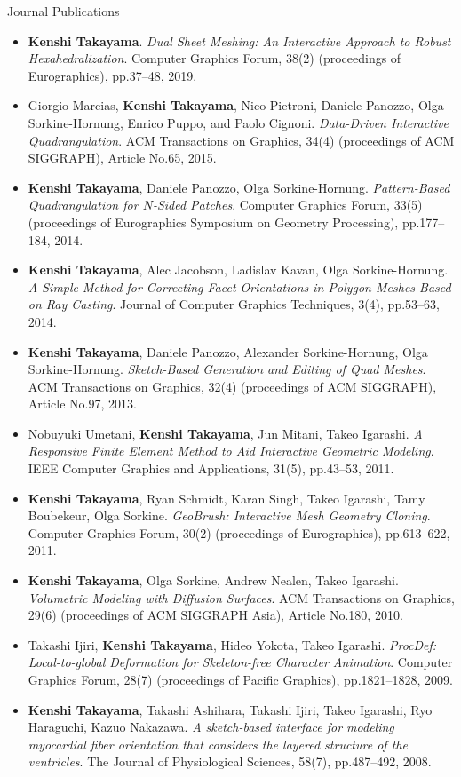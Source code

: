 {\Large\sc Journal Publications}
\vspace{-3mm}
\begin{itemize}
\item {\bf Kenshi Takayama}. {\it Dual Sheet Meshing: An Interactive Approach to Robust Hexahedralization}. Computer Graphics Forum, 38(2) (proceedings of Eurographics), pp.37--48, 2019.
\item Giorgio Marcias, {\bf Kenshi Takayama}, Nico Pietroni, Daniele Panozzo, Olga Sorkine-Hornung, Enrico Puppo, and Paolo Cignoni. {\it Data-Driven Interactive Quadrangulation}. ACM Transactions on Graphics, 34(4) (proceedings of ACM SIGGRAPH), Article No.65, 2015.
\item {\bf Kenshi Takayama}, Daniele Panozzo, Olga Sorkine-Hornung. {\it Pattern-Based Quadrangulation for $N$-Sided Patches}. Computer Graphics Forum, 33(5) (proceedings of Eurographics Symposium on Geometry Processing), pp.177--184, 2014.
\item {\bf Kenshi Takayama}, Alec Jacobson, Ladislav Kavan, Olga Sorkine-Hornung. {\it A Simple Method for Correcting Facet Orientations in Polygon Meshes Based on Ray Casting}. Journal of Computer Graphics Techniques, 3(4), pp.53--63, 2014.
\item {\bf Kenshi Takayama}, Daniele Panozzo, Alexander Sorkine-Hornung, Olga Sorkine-Hornung. {\it Sketch-Based Generation and Editing of Quad Meshes}. ACM Transactions on Graphics, 32(4) (proceedings of ACM SIGGRAPH), Article No.97, 2013.
\item Nobuyuki Umetani, {\bf Kenshi Takayama}, Jun Mitani, Takeo Igarashi. {\it A Responsive Finite Element Method to Aid Interactive Geometric Modeling}. IEEE Computer Graphics and Applications, 31(5), pp.43--53, 2011.
\item {\bf Kenshi Takayama}, Ryan Schmidt, Karan Singh, Takeo Igarashi, Tamy Boubekeur, Olga Sorkine. {\it GeoBrush: Interactive Mesh Geometry Cloning}. Computer Graphics Forum, 30(2) (proceedings of Eurographics), pp.613--622, 2011.
\item {\bf Kenshi Takayama}, Olga Sorkine, Andrew Nealen, Takeo Igarashi. {\it Volumetric Modeling with Diffusion Surfaces}. ACM Transactions on Graphics, 29(6) (proceedings of ACM SIGGRAPH Asia), Article No.180, 2010.
\item Takashi Ijiri, {\bf Kenshi Takayama}, Hideo Yokota, Takeo Igarashi. {\it ProcDef: Local-to-global Deformation for Skeleton-free Character Animation}. Computer Graphics Forum, 28(7) (proceedings of Pacific Graphics), pp.1821--1828, 2009.
\item {\bf Kenshi Takayama}, Takashi Ashihara, Takashi Ijiri, Takeo Igarashi, Ryo Haraguchi, Kazuo Nakazawa. {\it A sketch-based interface for modeling myocardial fiber orientation that considers the layered structure of the ventricles}. The Journal of Physiological Sciences, 58(7), pp.487--492, 2008.

\end{itemize}
